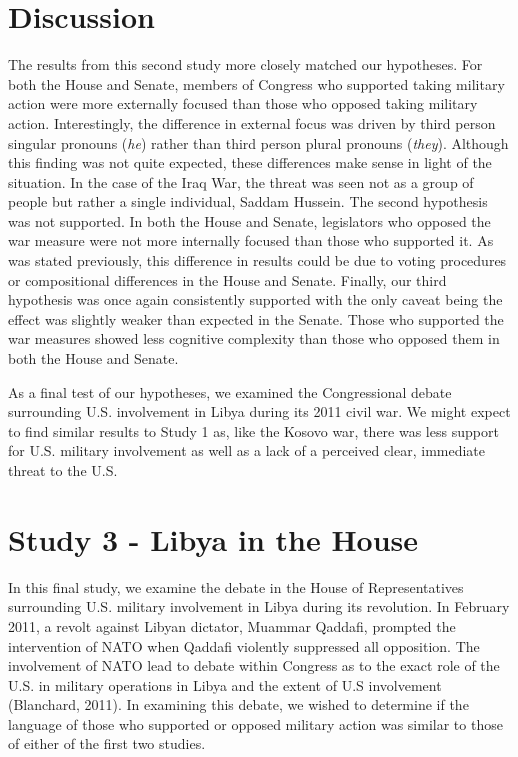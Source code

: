 \documentclass[
  english,
  ,man,floatsintext]{apa6}
\begin{document}
\hypertarget{discussion-1}{%
\section{Discussion}\label{discussion-1}}

The results from this second study more closely matched our hypotheses. For both the House and Senate, members of Congress who supported taking military action were more externally focused than those who opposed taking military action. Interestingly, the difference in external focus was driven by third person singular pronouns (\emph{he}) rather than third person plural pronouns (\emph{they}). Although this finding was not quite expected, these differences make sense in light of the situation. In the case of the Iraq War, the threat was seen not as a group of people but rather a single individual, Saddam Hussein. The second hypothesis was not supported. In both the House and Senate, legislators who opposed the war measure were not more internally focused than those who supported it. As was stated previously, this difference in results could be due to voting procedures or compositional differences in the House and Senate. Finally, our third hypothesis was once again consistently supported with the only caveat being the effect was slightly weaker than expected in the Senate. Those who supported the war measures showed less cognitive complexity than those who opposed them in both the House and Senate.

As a final test of our hypotheses, we examined the Congressional debate surrounding U.S. involvement in Libya during its 2011 civil war. We might expect to find similar results to Study 1 as, like the Kosovo war, there was less support for U.S. military involvement as well as a lack of a perceived clear, immediate threat to the U.S.

\hypertarget{study-3---libya-in-the-house}{%
\section{Study 3 - Libya in the House}\label{study-3---libya-in-the-house}}

In this final study, we examine the debate in the House of Representatives surrounding U.S. military involvement in Libya during its revolution. In February 2011, a revolt against Libyan dictator, Muammar Qaddafi, prompted the intervention of NATO when Qaddafi violently suppressed all opposition. The involvement of NATO lead to debate within Congress as to the exact role of the U.S. in military operations in Libya and the extent of U.S involvement (Blanchard, 2011). In examining this debate, we wished to determine if the language of those who supported or opposed military action was similar to those of either of the first two studies.
\end{document}
